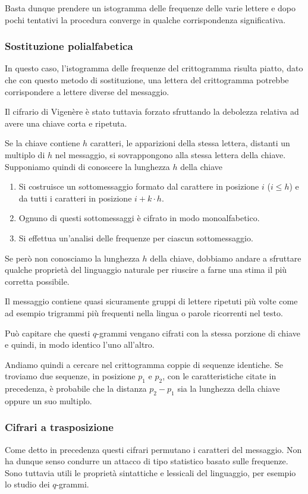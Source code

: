 Basta dunque prendere un istogramma delle frequenze delle varie lettere e dopo pochi tentativi la procedura converge in
qualche corrispondenza significativa.

\subsubsection{Sostituzione polialfabetica}
In questo caso, l'istogramma delle frequenze del crittogramma risulta piatto, dato che con questo metodo di
sostituzione, una lettera del crittogramma potrebbe corrispondere a lettere diverse del messaggio.

Il cifrario di Vigen\`ere \`e stato tuttavia forzato sfruttando la debolezza relativa ad avere una chiave corta e
ripetuta.

Se la chiave contiene $h$ caratteri, le apparizioni della stessa lettera, distanti un multiplo di $h$ nel messaggio, si
sovrappongono alla stessa lettera della chiave. Supponiamo quindi di conoscere la lunghezza $h$ della chiave
\begin{enumerate}
	\item Si costruisce un sottomessaggio formato dal carattere in posizione $i$ ($i \leq h$) e da tutti i caratteri
	      in posizione $i + k \cdot h$.
	\item Ognuno di questi sottomessaggi \`e cifrato in modo monoalfabetico.
	\item Si effettua un'analisi delle frequenze per ciascun sottomessaggio.
\end{enumerate}
Se per\`o non conosciamo la lunghezza $h$ della chiave, dobbiamo andare a sfruttare qualche propriet\`a del linguaggio
naturale per riuscire a farne una stima il pi\`u corretta possibile.

Il messaggio contiene quasi sicuramente gruppi di lettere ripetuti pi\`u volte come ad esempio trigrammi pi\`u frequenti
nella lingua o parole ricorrenti nel testo.

Pu\`o capitare che questi $q$-grammi vengano cifrati con la stessa porzione di chiave e quindi, in modo identico l'uno
all'altro.

Andiamo quindi a cercare nel crittogramma coppie di sequenze identiche. Se troviamo due sequenze, in posizione $p_1$ e
$p_2$, con le caratteristiche citate in precedenza, \`e probabile che la distanza $p_2 - p_1$ sia la lunghezza della
chiave oppure un suo multiplo.

\subsubsection{Cifrari a trasposizione}
Come detto in precedenza questi cifrari permutano i caratteri del messaggio. Non ha dunque senso condurre un attacco di
tipo statistico basato sulle frequenze. Sono tuttavia utili le propriet\`a sintattiche e lessicali del linguaggio, per
esempio lo studio dei $q$-grammi.

